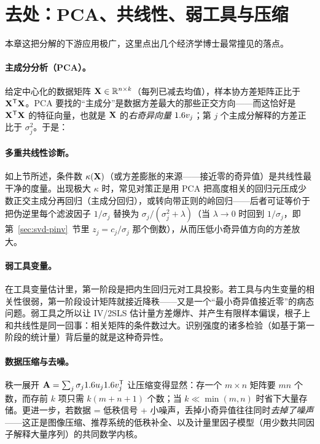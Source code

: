 \section{去处：PCA、共线性、弱工具与压缩}
\label{sec:svd-applications}

本章这把分解的下游应用极广，这里点出几个经济学博士最常撞见的落点。

\paragraph{主成分分析（PCA）。}
给定中心化的数据矩阵 $\mathbf{X}\in\mathbb{R}^{n\times k}$（每列已减去均值），样本协方差矩阵正比于 $\mathbf{X}^{\mathsf{T}}\mathbf{X}$。PCA 要找的``主成分''是数据方差最大的那些正交方向——而这恰好是 $\mathbf{X}^{\mathsf{T}}\mathbf{X}$ 的特征向量，也就是 $\mathbf{X}$ 的\emph{右奇异向量} $1.6 v_j$；第 $j$ 个主成分解释的方差正比于 $\sigma_j^2$。于是：


\paragraph{多重共线性诊断。}
如上节所述，条件数 $\kappa(\mathbf{X})$（或方差膨胀的来源——接近零的奇异值）是共线性最干净的度量。出现极大 $\kappa$ 时，常见对策正是用 PCA 把高度相关的回归元压成少数正交主成分再回归（主成分回归），或转向带正则的岭回归——后者可证等价于把伪逆里每个滤波因子 $1/\sigma_j$ 替换为 $\sigma_j/(\sigma_j^2+\lambda)$（当 $\lambda\to0$ 时回到 $1/\sigma_j$，即第~\ref{sec:svd-pinv}~节里 $z_j=c_j/\sigma_j$ 那个倒数），从而压低小奇异值方向的方差放大。

\paragraph{弱工具变量。}
在工具变量估计里，第一阶段是把内生回归元对工具投影。若工具与内生变量的相关性很弱，第一阶段设计矩阵就接近降秩——又是一个``最小奇异值接近零''的病态问题。弱工具之所以让 IV/2SLS 估计量方差爆炸、并产生有限样本偏误，根子上和共线性是同一回事：相关矩阵的条件数过大。识别强度的诸多检验（如基于第一阶段的统计量）背后量的就是这种奇异性。

\paragraph{数据压缩与去噪。}
秩一展开 $\mathbf{A}=\sum_j\sigma_j1.6 u_j1.6 v_j^{\mathsf{T}}$ 让压缩变得显然：存一个 $m\times n$ 矩阵要 $mn$ 个数，而存前 $k$ 项只需 $k(m+n+1)$ 个数；当 $k\ll\min(m,n)$ 时省下大量存储。更进一步，若数据 = 低秩信号 + 小噪声，丢掉小奇异值往往同时\emph{去掉了噪声}——这正是图像压缩、推荐系统的低秩补全、以及计量里因子模型（用少数共同因子解释大量序列）的共同数学内核。

